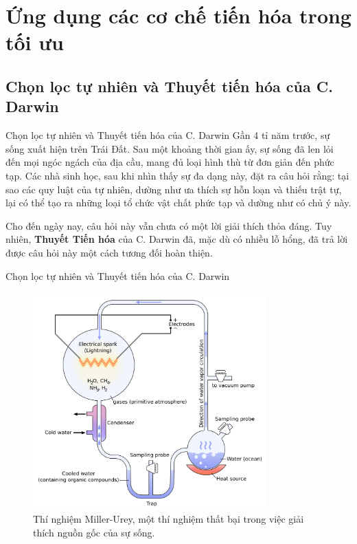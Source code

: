 \section{Ứng dụng các cơ chế tiến hóa trong tối ưu} %
\label{sec:Ứng dụng các cơ chế tiến hóa trong tối ưu}

\subsection{Chọn lọc tự nhiên và Thuyết tiến hóa của C. Darwin} %
\label{sub:Chọn lọc tự nhiên và Thuyết tiến hóa của C. Darwin}

\begin{frame}{Chọn lọc tự nhiên và Thuyết tiến hóa của C. Darwin}
Gần 4 tỉ năm trước, sự sống xuất hiện trên Trái Đất. Sau một khoảng thời gian
ấy, sự sống đã len lỏi đến mọi ngóc ngách của địa cầu, mang đủ loại hình thù từ
đơn giản đến phức tạp. Các nhà sinh học, sau khi nhìn thấy sự đa dạng này, đặt
ra câu hỏi rằng: tại sao các quy luật của tự nhiên, dường như ưa thích sự hỗn
loạn và thiếu trật tự, lại có thể tạo ra những loại tổ chức vật chất phức tạp và
dường như có chủ ý này.

Cho đến ngày nay, câu hỏi này vẫn chưa có một lời giải thích thỏa đáng. Tuy
nhiên, \textbf{Thuyết Tiến hóa} của C. Darwin đã, mặc dù có nhiều lỗ hổng, đã
trả lời được câu hỏi này một cách tương đối hoàn thiện.
\end{frame}

\begin{frame}{Chọn lọc tự nhiên và Thuyết tiến hóa của C. Darwin}
\begin{figure}
  \centering
  \includegraphics[width=0.8\textwidth, height=0.7\textheight,
  keepaspectratio]{res/miller-urey.png}
\captionsetup{justification=centering,margin=3cm}
  \caption{Thí nghiệm Miller-Urey, một thí nghiệm thất bại trong việc giải thích nguồn
  gốc của sự sống.}
\end{figure}
\end{frame}

